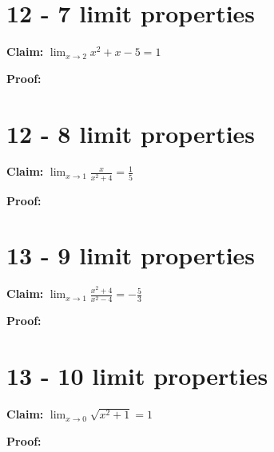 \documentclass[10pt,letterpaper]{article}
\newcommand\ds{\displaystyle}
\begin{document}
\section*{12 - 7 limit properties}

\textbf{Claim:} $\ds\lim_{x\to 2} x^2 + x - 5 = 1$

\medskip

\textbf{Proof:}

\section*{12 - 8 limit properties}

\textbf{Claim:} $\ds\lim_{x\to 1} \frac{x}{x^2 + 4} = \frac{1}{5}$

\medskip

\textbf{Proof:}

\section*{13 - 9 limit properties}

\textbf{Claim:} $\ds\lim_{x\to 1}\frac{x^2+4}{x^2-4} = -\frac{5}{3}$

\medskip

\textbf{Proof:}

\section*{13 - 10 limit properties}

\textbf{Claim:} $\ds\lim_{x\to 0} \sqrt{x^2 + 1} = 1$

\medskip

\textbf{Proof:}
\end{document}
